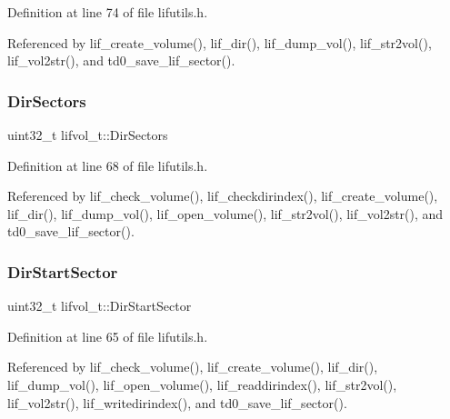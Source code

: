Definition at line 74 of file lifutils.\+h.



Referenced by lif\+\_\+create\+\_\+volume(), lif\+\_\+dir(), lif\+\_\+dump\+\_\+vol(), lif\+\_\+str2vol(), lif\+\_\+vol2str(), and td0\+\_\+save\+\_\+lif\+\_\+sector().

\mbox{\label{structlifvol__t_aceac3bc67cda1f79d91c002411e33897}} 
\subsubsection{\texorpdfstring{Dir\+Sectors}{DirSectors}}
{\footnotesize\ttfamily uint32\+\_\+t lifvol\+\_\+t\+::\+Dir\+Sectors}



Definition at line 68 of file lifutils.\+h.



Referenced by lif\+\_\+check\+\_\+volume(), lif\+\_\+checkdirindex(), lif\+\_\+create\+\_\+volume(), lif\+\_\+dir(), lif\+\_\+dump\+\_\+vol(), lif\+\_\+open\+\_\+volume(), lif\+\_\+str2vol(), lif\+\_\+vol2str(), and td0\+\_\+save\+\_\+lif\+\_\+sector().

\mbox{\label{structlifvol__t_a89b86c990a7843cfa2addfff9a775137}} 
\subsubsection{\texorpdfstring{Dir\+Start\+Sector}{DirStartSector}}
{\footnotesize\ttfamily uint32\+\_\+t lifvol\+\_\+t\+::\+Dir\+Start\+Sector}



Definition at line 65 of file lifutils.\+h.



Referenced by lif\+\_\+check\+\_\+volume(), lif\+\_\+create\+\_\+volume(), lif\+\_\+dir(), lif\+\_\+dump\+\_\+vol(), lif\+\_\+open\+\_\+volume(), lif\+\_\+readdirindex(), lif\+\_\+str2vol(), lif\+\_\+vol2str(), lif\+\_\+writedirindex(), and td0\+\_\+save\+\_\+lif\+\_\+sector().

\mbox{\label{structlifvol__t_abbccb2f637812a31d24aa1f6725194be}} 
